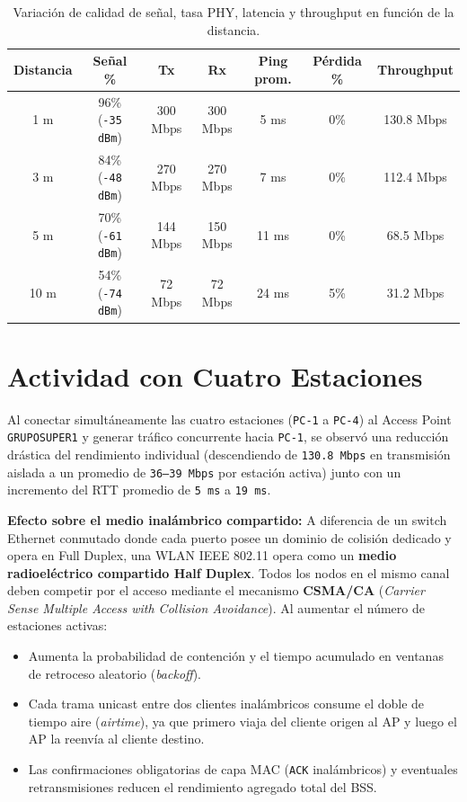 \documentclass[11pt, a4paper]{article}
\begin{document}
\begin{table}[h!]
\centering
\small
\setlength{\tabcolsep}{4pt}
\caption{Variación de calidad de señal, tasa PHY, latencia y throughput en función de la distancia.}
\begin{tabularx}{\textwidth}{ccccccc}
\toprule
\textbf{Distancia} & \textbf{Señal \%} & \textbf{Tx} & \textbf{Rx} & \textbf{Ping prom.} & \textbf{Pérdida \%} & \textbf{Throughput} \\
\midrule
1 m  & 96\% (\texttt{-35 dBm}) & 300 Mbps & 300 Mbps & 5 ms  & 0\% & 130.8 Mbps \\
3 m  & 84\% (\texttt{-48 dBm}) & 270 Mbps & 270 Mbps & 7 ms  & 0\% & 112.4 Mbps \\
5 m  & 70\% (\texttt{-61 dBm}) & 144 Mbps & 150 Mbps & 11 ms & 0\% & 68.5 Mbps \\
10 m & 54\% (\texttt{-74 dBm}) & 72 Mbps  & 72 Mbps  & 24 ms & 5\% & 31.2 Mbps \\
\bottomrule
\end{tabularx}
\end{table}

\section{Actividad con Cuatro Estaciones}

Al conectar simultáneamente las cuatro estaciones (\texttt{PC-1} a \texttt{PC-4}) al Access Point \texttt{GRUPOSUPER1} y generar tráfico concurrente hacia \texttt{PC-1}, se observó una reducción drástica del rendimiento individual (descendiendo de \texttt{130.8 Mbps} en transmisión aislada a un promedio de \texttt{36--39 Mbps} por estación activa) junto con un incremento del RTT promedio de \texttt{5 ms} a \texttt{19 ms}.

\noindent \textbf{Efecto sobre el medio inalámbrico compartido:} A diferencia de un switch Ethernet conmutado donde cada puerto posee un dominio de colisión dedicado y opera en Full Duplex, una WLAN IEEE 802.11 opera como un \textbf{medio radioeléctrico compartido Half Duplex}. Todos los nodos en el mismo canal deben competir por el acceso mediante el mecanismo \textbf{CSMA/CA} (\textit{Carrier Sense Multiple Access with Collision Avoidance}). Al aumentar el número de estaciones activas:
\begin{itemize}
    \item Aumenta la probabilidad de contención y el tiempo acumulado en ventanas de retroceso aleatorio (\textit{backoff}).
    \item Cada trama unicast entre dos clientes inalámbricos consume el doble de tiempo aire (\textit{airtime}), ya que primero viaja del cliente origen al AP y luego el AP la reenvía al cliente destino.
    \item Las confirmaciones obligatorias de capa MAC (\texttt{ACK} inalámbricos) y eventuales retransmisiones reducen el rendimiento agregado total del BSS.
\end{itemize}
\end{document}
